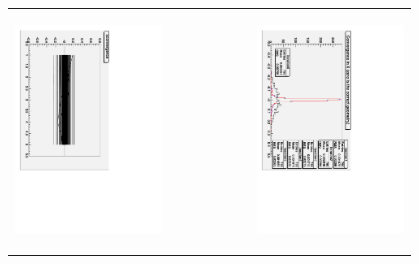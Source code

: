 \documentclass[compress]{beamer}
\begin{document}
\begin{frame}
\begin{center}
\begin{tabular}{p{0.4\linewidth} c p{0.4\linewidth}}
\begin{minipage}{\linewidth}
    \begin{center}
      \includegraphics[height=\linewidth, angle=90]{convergence_is_all_in_iter1_lines.pdf}
    \end{center}
  \end{minipage} & &
  \begin{minipage}{\linewidth}
      \includegraphics[height=\linewidth, angle=90]{convergence_is_all_in_iter1.pdf}

\end{minipage}
\end{tabular}
\end{center}
\end{frame}
\end{document}
